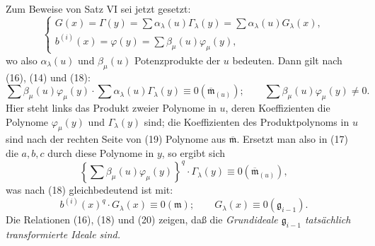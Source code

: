 \documentclass[11pt]{article}
\newcommand{\mideal}{\mathfrak m}
\newcommand{\gideal}{\mathfrak g}
\newcommand{\zero}[1]{\equiv 0(#1)}
\begin{document}
Zum Beweise von Satz VI sei jetzt gesetzt:
\begin{equation}
\begin{cases}
 G(x)=\Gamma(y)=\sum \alpha_\lambda(u)\Gamma_\lambda(y)=\sum \alpha_\lambda(u)G_\lambda(x),\\
 b^{(i)}(x)=\varphi(y)=\sum \beta_\mu(u)\varphi_\mu(y),
\end{cases}
\tag{18}
\end{equation}
wo also $\alpha_\lambda(u)$ und $\beta_\mu(u)$ Potenzprodukte der $u$ bedeuten. Dann gilt nach (16), (14) und (18):
\begin{equation}
 \sum\beta_\mu(u)\varphi_\mu(y)\cdot
 \sum\alpha_\lambda(u)\Gamma_\lambda(y)\zero{\overline{\mideal}_{(u)}};
 \qquad
 \sum\beta_\mu(u)\varphi_\mu(y)\ne0.
\tag{19}
\end{equation}
Hier steht links das Produkt zweier Polynome in $u$, deren Koeffizienten die Polynome $\varphi_\mu(y)$ und $\Gamma_\lambda(y)$ sind; die Koeffizienten des Produktpolynoms in $u$ sind nach der rechten Seite von (19) Polynome aus $\overline{\mideal}$. Ersetzt man also in (17) die $a,b,c$ durch diese Polynome in $y$, so ergibt sich
\[
 \left\{\sum\beta_\mu(u)\varphi_\mu(y)\right\}^q\cdot \Gamma_\lambda(y)\zero{\overline{\mideal}_{(u)}},
\]
was nach (18) gleichbedeutend ist mit:
\begin{equation}
 b^{(i)}(x)^q\cdot G_\lambda(x)\zero{\mideal};
 \qquad
 G_\lambda(x)\zero{\gideal_{i-1}}.
\tag{20}
\end{equation}
Die Relationen (16), (18) und (20) zeigen, daß die \emph{Grundideale $\gideal_{i-1}$ tatsächlich transformierte Ideale sind.}
\end{document}
